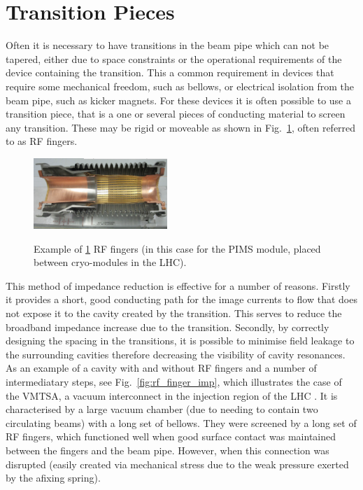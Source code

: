 \section{Transition Pieces}
\label{sec:transitions}

Often it is necessary to have transitions in the beam pipe which can not be tapered, either due to space constraints or the operational requirements of the device containing the transition. This a common requirement in devices that require some mechanical freedom, such as bellows, or electrical isolation from the beam pipe, such as kicker magnets. For these devices it is often possible to use a transition piece, that is a one or several pieces of conducting material to screen any transition. These may be rigid or moveable as shown in Fig.~\ref{fig:rf_fingers}, often referred to as RF fingers.

\begin{figure}
\begin{center}
\includegraphics[width=0.45\textwidth]{Beam_Coupling_Impedance_Reduction_Techniques/figures/pimsImage.png}
\label{fig:rf_fingers}
\end{center}
\caption{Example of \ref{fig:rf_fingers} RF fingers (in this case for the PIMS module, placed between cryo-modules in the LHC).}
\end{figure}


This method of impedance reduction is effective for a number of reasons. Firstly it provides a short, good conducting path for the image currents to flow that does not expose it to the cavity created by the transition. This serves to reduce the broadband impedance increase due to the transition. Secondly, by correctly designing the spacing in the transitions, it is possible to minimise field leakage to the surrounding cavities therefore decreasing the visibility of cavity resonances. As an example of a cavity with and without RF fingers and a number of intermediatary steps, see Fig.~\ref{fig:rf_finger_imp}, which illustrates the case of the VMTSA, a vacuum interconnect in the injection region of the LHC \cite{Salvant:VMTSA}. It is characterised by a large vacuum chamber (due to needing to contain two circulating beams) with a long set of bellows. They were screened by a long set of RF fingers, which functioned well when good surface contact was maintained between the fingers and the beam pipe. However, when this connection was disrupted (easily created via mechanical stress due to the weak pressure exerted by the afixing spring).


